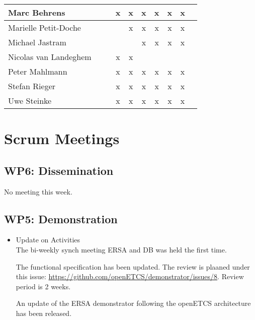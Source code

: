 \documentclass[a4paper, 11pt]{article}
\begin{document}
\begin{tabular}{|l|c|c|c||c|c|c||c|c|c|}
Marc Behrens          &   &   & x & x & x & x & x & x \\\hline
Marielle Petit-Doche  &   &   &   & x & x & x & x & x \\\hline
Michael Jastram       &   &   &   &   & x & x & x & x \\\hline
Nicolas van Landeghem &   &   & x & x &   &   &   &   \\\hline
Peter Mahlmann        &   &   & x & x & x & x & x & x \\\hline
Stefan Rieger         &   &   & x & x & x & x & x & x \\\hline
Uwe Steinke           &   &   & x & x & x & x & x & x \\\hline
\end{tabular}


\section{Scrum Meetings}

\subsection{WP6: Dissemination}

No meeting this week.

\subsection{WP5: Demonstration}
\begin{itemize}
\item Update on Activities\\
The bi-weekly synch meeting ERSA and DB was held the first time. 

The functional specification has been updated. The review is plaaned under this issue: \url{https://github.com/openETCS/demonstrator/issues/8}. Review period is 2 weeks.

An update of the ERSA demonstrator following the openETCS architecture has been released. 

\end{itemize}
\end{document}
